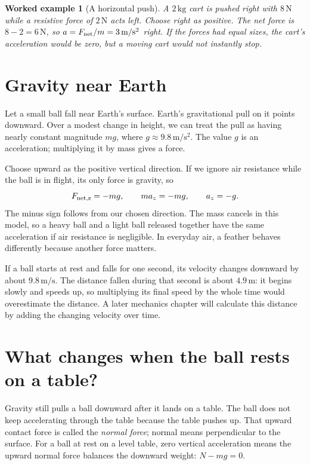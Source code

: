 \documentclass[11pt,oneside]{book}
\theoremstyle{reviewstyle}
\newtheorem{example}{Worked example}[chapter]
\begin{document}
\begin{example}[A horizontal push]
A $2\,\mathrm{kg}$ cart is pushed right with $8\,\mathrm N$ while a resistive force of $2\,\mathrm N$ acts left. Choose right as positive. The net force is $8-2=6\,\mathrm N$, so $a=F_{\rm net}/m=3\,\mathrm{m/s^2}$ right. If the forces had equal sizes, the cart's acceleration would be zero, but a moving cart would not instantly stop.
\end{example}

\section{Gravity near Earth}
Let a small ball fall near Earth's surface. Earth's gravitational pull on it points downward. Over a modest change in height, we can treat the pull as having nearly constant magnitude $mg$, where $g\approx9.8\,\mathrm{m/s^2}$. The value $g$ is an acceleration; multiplying it by mass gives a force.

Choose upward as the positive vertical direction. If we ignore air resistance while the ball is in flight, its only force is gravity, so
\begin{equation}
F_{\rm net,z}=-mg,\qquad ma_z=-mg,\qquad a_z=-g.
\end{equation}
The minus sign follows from our chosen direction. The mass cancels in this model, so a heavy ball and a light ball released together have the same acceleration if air resistance is negligible. In everyday air, a feather behaves differently because another force matters.

If a ball starts at rest and falls for one second, its velocity changes downward by about $9.8\,\mathrm{m/s}$. The distance fallen during that second is about $4.9\,\mathrm m$: it begins slowly and speeds up, so multiplying its final speed by the whole time would overestimate the distance. A later mechanics chapter will calculate this distance by adding the changing velocity over time.

\section{What changes when the ball rests on a table?}
Gravity still pulls a ball downward after it lands on a table. The ball does not keep accelerating through the table because the table pushes up. That upward contact force is called the \emph{normal force}; normal means perpendicular to the surface. For a ball at rest on a level table, zero vertical acceleration means the upward normal force balances the downward weight: $N-mg=0$.
\end{document}
